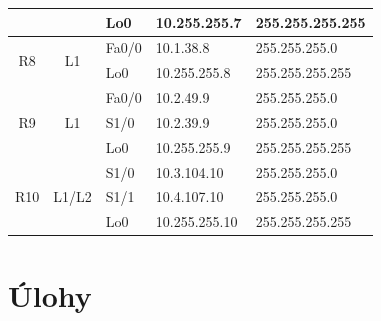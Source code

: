 \documentclass[12pt,twoside,a4paper]{report}
\begin{document}
\begin{table}[!htb]
\begin{tabular}{|c|c|l|l|l|}
                     &                                         & Lo0                                     & 10.255.255.7                            & 255.255.255.255                     \\ \hline
\multirow{2}{*}{R8}  & \multirow{2}{*}{L1}             & Fa0/0                                   & 10.1.38.8                               & 255.255.255.0                       \\ \cline{3-5} 
                     &                                         & Lo0                                     & 10.255.255.8                            & 255.255.255.255                     \\ \hline
\multirow{3}{*}{R9}  & \multirow{3}{*}{L1}             & Fa0/0                                   & 10.2.49.9                               & 255.255.255.0                       \\ \cline{3-5} 
                     &                                         & S1/0                                    & 10.2.39.9                               & 255.255.255.0                       \\ \cline{3-5} 
                     &                                         & Lo0                                     & 10.255.255.9                            & 255.255.255.255                     \\ \hline
\multirow{3}{*}{R10} & \multirow{3}{*}{L1/L2}                    & S1/0                                    & 10.3.104.10                              & 255.255.255.0                       \\ \cline{3-5} 
                     &                                         & S1/1                                    & 10.4.107.10                              & 255.255.255.0                       \\ \cline{3-5} 
                     &                                         & Lo0                                     & 10.255.255.10                           & 255.255.255.255                     \\ \hline
\end{tabular}
\end{table}


\newpage


\section{Úlohy}
\end{document}
